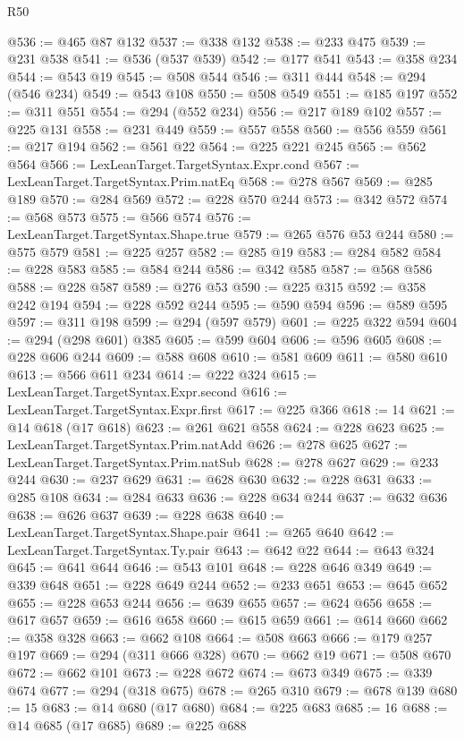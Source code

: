 \begin{lexlean}{R50}
\begin{coremodule}
@536 := @465 @87 @132
@537 := @338 @132
@538 := @233 @475
@539 := @231 @538
@541 := @536 (@537 @539)
@542 := @177 @541
@543 := @358 @234
@544 := @543 @19
@545 := @508 @544
@546 := @311 @444
@548 := @294 (@546 @234)
@549 := @543 @108
@550 := @508 @549
@551 := @185 @197
@552 := @311 @551
@554 := @294 (@552 @234)
@556 := @217 @189 @102
@557 := @225 @131
@558 := @231 @449
@559 := @557 @558
@560 := @556 @559
@561 := @217 @194
@562 := @561 @22
@564 := @225 @221 @245
@565 := @562 @564
@566 := LexLeanTarget.TargetSyntax.Expr.cond
@567 := LexLeanTarget.TargetSyntax.Prim.natEq
@568 := @278 @567
@569 := @285 @189
@570 := @284 @569
@572 := @228 @570 @244
@573 := @342 @572
@574 := @568 @573
@575 := @566 @574
@576 := LexLeanTarget.TargetSyntax.Shape.true
@579 := @265 @576 @53 @244
@580 := @575 @579
@581 := @225 @257
@582 := @285 @19
@583 := @284 @582
@584 := @228 @583
@585 := @584 @244
@586 := @342 @585
@587 := @568 @586
@588 := @228 @587
@589 := @276 @53
@590 := @225 @315
@592 := @358 @242 @194
@594 := @228 @592 @244
@595 := @590 @594
@596 := @589 @595
@597 := @311 @198
@599 := @294 (@597 @579)
@601 := @225 @322 @594
@604 := @294 (@298 @601) @385
@605 := @599 @604
@606 := @596 @605
@608 := @228 @606 @244
@609 := @588 @608
@610 := @581 @609
@611 := @580 @610
@613 := @566 @611 @234
@614 := @222 @324
@615 := LexLeanTarget.TargetSyntax.Expr.second
@616 := LexLeanTarget.TargetSyntax.Expr.first
@617 := @225 @366
@618 := 14
@621 := @14 @618 (@17 @618)
@623 := @261 @621 @558
@624 := @228 @623
@625 := LexLeanTarget.TargetSyntax.Prim.natAdd
@626 := @278 @625
@627 := LexLeanTarget.TargetSyntax.Prim.natSub
@628 := @278 @627
@629 := @233 @244
@630 := @237 @629
@631 := @628 @630
@632 := @228 @631
@633 := @285 @108
@634 := @284 @633
@636 := @228 @634 @244
@637 := @632 @636
@638 := @626 @637
@639 := @228 @638
@640 := LexLeanTarget.TargetSyntax.Shape.pair
@641 := @265 @640
@642 := LexLeanTarget.TargetSyntax.Ty.pair
@643 := @642 @22
@644 := @643 @324
@645 := @641 @644
@646 := @543 @101
@648 := @228 @646 @349
@649 := @339 @648
@651 := @228 @649 @244
@652 := @233 @651
@653 := @645 @652
@655 := @228 @653 @244
@656 := @639 @655
@657 := @624 @656
@658 := @617 @657
@659 := @616 @658
@660 := @615 @659
@661 := @614 @660
@662 := @358 @328
@663 := @662 @108
@664 := @508 @663
@666 := @179 @257 @197
@669 := @294 (@311 @666 @328)
@670 := @662 @19
@671 := @508 @670
@672 := @662 @101
@673 := @228 @672
@674 := @673 @349
@675 := @339 @674
@677 := @294 (@318 @675)
@678 := @265 @310
@679 := @678 @139
@680 := 15
@683 := @14 @680 (@17 @680)
@684 := @225 @683
@685 := 16
@688 := @14 @685 (@17 @685)
@689 := @225 @688

\end{coremodule}
\end{lexlean}
